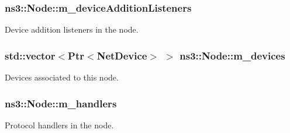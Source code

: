 \subsubsection[{\texorpdfstring{m\+\_\+device\+Addition\+Listeners}{m_deviceAdditionListeners}}]{ ns3\+::\+Node\+::m\+\_\+device\+Addition\+Listeners\hspace{0.3cm}{\ttfamily [private]}}\hypertarget{classns3_1_1Node_a2069747966a2e0192d47fbc25e6b5d7f}{}\label{classns3_1_1Node_a2069747966a2e0192d47fbc25e6b5d7f}


Device addition listeners in the node. 

\subsubsection[{\texorpdfstring{m\+\_\+devices}{m_devices}}]{\setlength{\rightskip}{0pt plus 5cm}std\+::vector$<${\bf Ptr}$<${\bf Net\+Device}$>$ $>$ ns3\+::\+Node\+::m\+\_\+devices\hspace{0.3cm}{\ttfamily [private]}}\hypertarget{classns3_1_1Node_af0ba0670e62825e6953317a7a028aa40}{}\label{classns3_1_1Node_af0ba0670e62825e6953317a7a028aa40}


Devices associated to this node. 

\subsubsection[{\texorpdfstring{m\+\_\+handlers}{m_handlers}}]{ ns3\+::\+Node\+::m\+\_\+handlers\hspace{0.3cm}{\ttfamily [private]}}\hypertarget{classns3_1_1Node_ab83de89d6f361c6fbb3a92f03523b8d0}{}\label{classns3_1_1Node_ab83de89d6f361c6fbb3a92f03523b8d0}


Protocol handlers in the node. 

